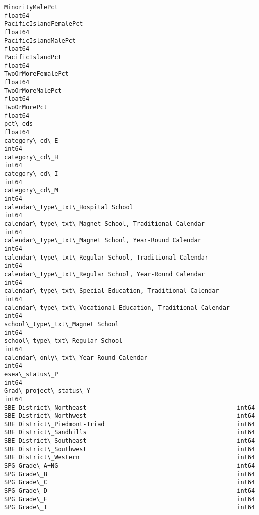 \documentclass[11pt]{article}
\begin{document}
\begin{Verbatim}[commandchars=\\\{\}]
MinorityMalePct                                                 float64
PacificIslandFemalePct                                          float64
PacificIslandMalePct                                            float64
PacificIslandPct                                                float64
TwoOrMoreFemalePct                                              float64
TwoOrMoreMalePct                                                float64
TwoOrMorePct                                                    float64
pct\_eds                                                         float64
category\_cd\_E                                                   int64
category\_cd\_H                                                   int64
category\_cd\_I                                                   int64
category\_cd\_M                                                   int64
calendar\_type\_txt\_Hospital School                               int64
calendar\_type\_txt\_Magnet School, Traditional Calendar           int64
calendar\_type\_txt\_Magnet School, Year-Round Calendar            int64
calendar\_type\_txt\_Regular School, Traditional Calendar          int64
calendar\_type\_txt\_Regular School, Year-Round Calendar           int64
calendar\_type\_txt\_Special Education, Traditional Calendar       int64
calendar\_type\_txt\_Vocational Education, Traditional Calendar    int64
school\_type\_txt\_Magnet School                                   int64
school\_type\_txt\_Regular School                                  int64
calendar\_only\_txt\_Year-Round Calendar                           int64
esea\_status\_P                                                   int64
Grad\_project\_status\_Y                                           int64
SBE District\_Northeast                                          int64
SBE District\_Northwest                                          int64
SBE District\_Piedmont-Triad                                     int64
SBE District\_Sandhills                                          int64
SBE District\_Southeast                                          int64
SBE District\_Southwest                                          int64
SBE District\_Western                                            int64
SPG Grade\_A+NG                                                  int64
SPG Grade\_B                                                     int64
SPG Grade\_C                                                     int64
SPG Grade\_D                                                     int64
SPG Grade\_F                                                     int64
SPG Grade\_I                                                     int64

\end{Verbatim}
\end{document}
